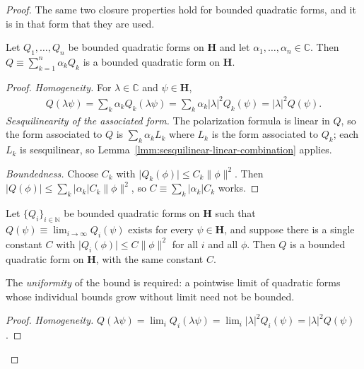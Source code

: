 \begin{proof}
The same two closure properties hold for bounded quadratic forms, and it is in that form that they are used.

\begin{lemma}
    \label{lmm:bqf-linear-combination}
    \leanok
    Let $Q_1, \ldots, Q_n$ be bounded quadratic forms on $\mathbf{H}$ and let $\alpha_1, \ldots, \alpha_n \in \mathbb{C}$. Then $Q \equiv \sum_{k=1}^n \alpha_k Q_k$ is a bounded quadratic form on $\mathbf{H}$.
\end{lemma}
\begin{proof}
    \leanok
\textit{Homogeneity.} For $\lambda \in \mathbb{C}$ and $\psi \in \mathbf{H}$,
\begin{align}
    Q(\lambda\psi) = \sum_k \alpha_k Q_k(\lambda\psi) = \sum_k \alpha_k \lvert \lambda \rvert^2 Q_k(\psi) = \lvert \lambda \rvert^2 Q(\psi).
\end{align}
\textit{Sesquilinearity of the associated form.} The polarization formula is linear in $Q$, so the form associated to $Q$ is $\sum_k \alpha_k L_k$ where $L_k$ is the form associated to $Q_k$; each $L_k$ is sesquilinear, so Lemma~\ref{lmm:sesquilinear-linear-combination} applies.

\textit{Boundedness.} Choose $C_k$ with $\lvert Q_k(\phi) \rvert \le C_k \lVert \phi \rVert^2$. Then $\lvert Q(\phi) \rvert \le \sum_k \lvert \alpha_k \rvert C_k \lVert \phi \rVert^2$, so $C \equiv \sum_k \lvert \alpha_k \rvert C_k$ works.
\end{proof}

\begin{lemma}
    \label{lmm:bqf-pointwise-limit}
    \leanok
    Let $\{Q_i\}_{i \in \mathbb{N}}$ be bounded quadratic forms on $\mathbf{H}$ such that $Q(\psi) \equiv \lim_{i \rightarrow \infty} Q_i(\psi)$ exists for every $\psi \in \mathbf{H}$, and suppose there is a single constant $C$ with $\lvert Q_i(\phi) \rvert \le C \lVert \phi \rVert^2$ for all $i$ and all $\phi$. Then $Q$ is a bounded quadratic form on $\mathbf{H}$, with the same constant $C$.

    The \textit{uniformity} of the bound is required: a pointwise limit of quadratic forms whose individual bounds grow without limit need not be bounded.
\end{lemma}
\begin{proof}
    \leanok
\textit{Homogeneity.} $Q(\lambda\psi) = \lim_i Q_i(\lambda\psi) = \lim_i \lvert \lambda \rvert^2 Q_i(\psi) = \lvert \lambda \rvert^2 Q(\psi)$.


\end{proof}
\end{proof}

